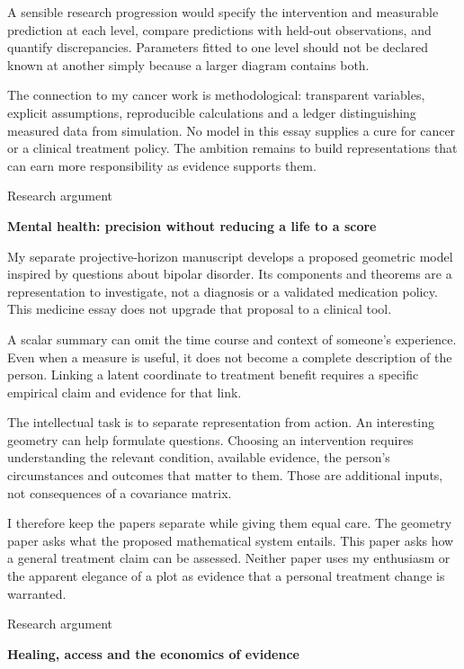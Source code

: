 \documentclass[10pt]{article}
\begin{document}
A sensible research progression would specify the intervention and measurable prediction at each level, compare predictions with held-out observations, and quantify discrepancies. Parameters fitted to one level should not be declared known at another simply because a larger diagram contains both.\par
The connection to my cancer work is methodological: transparent variables, explicit assumptions, reproducible calculations and a ledger distinguishing measured data from simulation. No model in this essay supplies a cure for cancer or a clinical treatment policy. The ambition remains to build representations that can earn more responsibility as evidence supports them.\par
\clearpage
{\small\color{accent}Research argument}\par
{\LARGE\bfseries\color{ink}Mental health: precision without reducing a life to a score}\par\vspace{7pt}
My separate projective-horizon manuscript develops a proposed geometric model inspired by questions about bipolar disorder. Its components and theorems are a representation to investigate, not a diagnosis or a validated medication policy. This medicine essay does not upgrade that proposal to a clinical tool.\par
A scalar summary can omit the time course and context of someone's experience. Even when a measure is useful, it does not become a complete description of the person. Linking a latent coordinate to treatment benefit requires a specific empirical claim and evidence for that link.\par
The intellectual task is to separate representation from action. An interesting geometry can help formulate questions. Choosing an intervention requires understanding the relevant condition, available evidence, the person's circumstances and outcomes that matter to them. Those are additional inputs, not consequences of a covariance matrix.\par
I therefore keep the papers separate while giving them equal care. The geometry paper asks what the proposed mathematical system entails. This paper asks how a general treatment claim can be assessed. Neither paper uses my enthusiasm or the apparent elegance of a plot as evidence that a personal treatment change is warranted.\par
\clearpage
{\small\color{accent}Research argument}\par
{\LARGE\bfseries\color{ink}Healing, access and the economics of evidence}\par\vspace{7pt}
\end{document}
